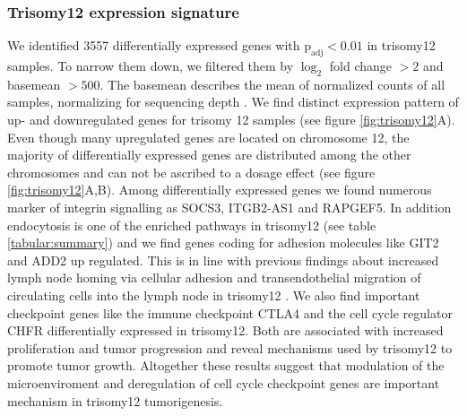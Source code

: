\subsubsection{Trisomy12 expression signature}
We identified 3557 differentially expressed genes with $\text{p}_\text{adj} < 0.01$ in trisomy12 samples. To narrow them down, we filtered them by $\log_2$ fold change $>2$ and basemean $> 500$. The basemean describes the mean of normalized counts of all samples, normalizing for sequencing depth \citep{Love2014}. We find distinct expression pattern of up- and downregulated genes for  trisomy 12 samples (see figure \ref {fig:trisomy12}A). Even though many upregulated genes are located on chromosome 12, the majority of differentially expressed genes are distributed among the other chromosomes and can not be ascribed to a dosage effect (see figure \ref {fig:trisomy12}A,B). Among differentially expressed genes we found numerous marker of integrin signalling as SOCS3, ITGB2-AS1 and RAPGEF5. In addition endocytosis is one of the enriched pathways in trisomy12 (see table \ref {tabular:summary}) and we find genes coding for adhesion molecules like GIT2 and ADD2 up regulated. This is in line with previous findings about increased lymph node homing via cellular adhesion and transendothelial migration of circulating cells into the lymph node in trisomy12 \citep{Riches2014,Ganghammer2015}. We also find important checkpoint genes like the immune checkpoint CTLA4  and the cell cycle regulator CHFR differentially expressed in trisomy12. Both are associated with increased proliferation and tumor progression \citep{Mittal2013, Oh2009} and reveal mechanisms used by trisomy12 to promote tumor growth. Altogether these results suggest that modulation of the microenviroment and deregulation of cell cycle checkpoint genes are important mechanism in trisomy12 tumorigenesis. 


